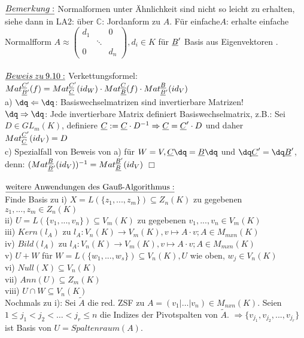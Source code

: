 \documentclass[fleqn, a4paper, 11pt]{article}
\begin{document}
\\
$\uline{Bemerkung:}$ Normalformen unter \"Ahnlichkeit sind nicht so leicht zu erhalten, siehe dann in LA2: \"uber $\mathbb{C}$: Jordanform zu $A$. F\"ur \dq einfache\dq $A$: erhalte \dq einfache \dq Normalfform $A\approx\begin{pmatrix}
	d_1 & & 0\\
	 & \ddots & \\
	 0 & & d_n
\end{pmatrix}, d_i\in K$ f\"ur $\uline{B}'$ Basis aus \dq Eigenvektoren \dq.\\
\\
$\uline{Beweis\:zu\:9.10:}$ Verkettungsformel: $Mat_{\uline{B}'}^{\uline{C}'}(f)=Mat_{\uline{C}}^{\uline{C}'}(id_W)\cdot Mat_{\uline{B}}^{\uline{C}}(f)\cdot Mat_{\uline{B}'}^{\uline{B}}(id_V)$\\
a) $\dq\Leftarrow\dq$: Basiswechselmatrizen sind invertierbare Matrizen!\\
$\dq\Rightarrow\dq$: Jede invertierbare Matrix definiert Basiswechselmatrix, z.B.: Sei $D\in GL_m(K)$, definiere $\uline{C}:=\uline{C}\cdot D^{-1}\Rightarrow \uline{C}=\uline{C}'\cdot D$ und daher $Mat_{\uline{C}}^{\uline{C}'}(id_V)=D$\\
c) Spezialfall von Beweis von a) f\"ur $W=V, \uline{C}\dq =\uline{B}\dq$ und $\dq\uline{C}'=\dq \uline{B}'$, denn: $(Mat_{\uline{B}'}^{\uline{B}}(id_V))^{-1} =Mat_{\uline{B}}^{\uline{B}'}(id_V)$ \hfill $\Box$\\
\\
$\uline{\text{weitere Anwendungen des Gau\ss{}-Algorithmus}:}$\\
Finde Basis zu i) $X=L(\{z_1,...,z_m\})\subseteq Z_n(K)$ zu gegebenen $z_1,...,z_m\in Z_n(K)$\\
ii) $U=L(\{v_1,...,v_n\})\subseteq V_m(K)$ zu gegebenen $v_1,...,v_n\in V_m(K)$\\
iii) $Kern(l_A)$ zu $l_A:V_n(K)\rightarrow V_m(K),v\mapsto A\cdot v; A\in M_{mxn}(K)$\\
iv) $Bild(l_A)$ zu $l_A:V_n(K)\rightarrow V_m(K),v\mapsto A\cdot v; A\in M_{mxn}(K)$ \\
v) $U+W$ f\"ur $W=L(\{w_1,...,w_s\})\subseteq V_n(K),U$ wie oben, $w_j\in V_n(K)$\\
vi) $Null(X)\subseteq V_n(K)$\\
vii) $Ann(U)\subseteq Z_m(K)$\\
viii) $U\cap W\subseteq V_n(K)$\\
Nochmals zu i): Sei $\tilde{A}$ die red. ZSF zu $A=(v_1|\dots|v_n)\in M_{nxn}(K)$. Seien $1\leq j_1 < j_2 < \dots < j_r \leq n$ die Indizes der Pivotspalten von $\tilde{A}$. $\Rightarrow \{v_{j_1},v_{j_2},...,v_{j_r}\}$ ist Basis von $U= Spaltenraum(A)$.\\
\\
\newpage
\end{document}
